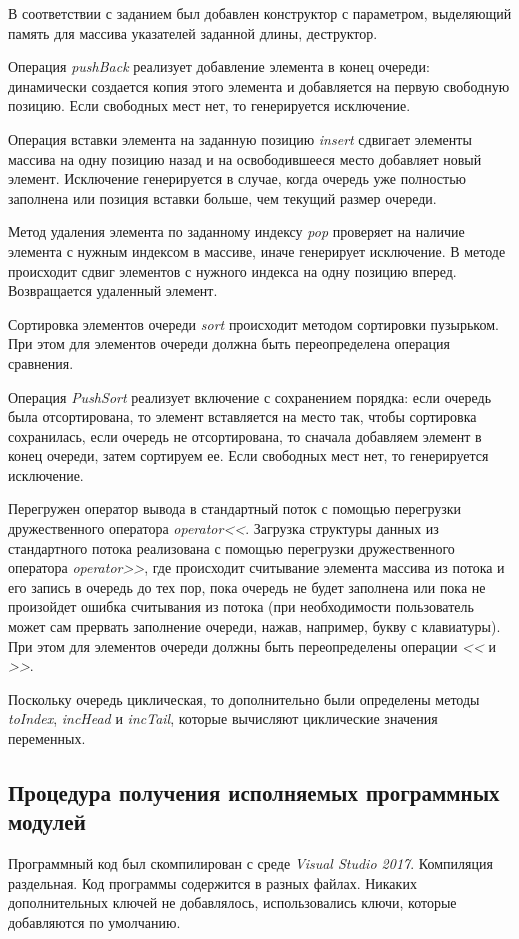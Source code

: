 \documentclass[a4paper,14pt]{article}
\begin{document}
В соответствии с заданием был добавлен конструктор с параметром, выделяющий память для массива указателей заданной длины, деструктор.

Операция \textit{pushBack} реализует добавление элемента в конец очереди: динамически создается копия этого элемента и добавляется на первую свободную позицию. Если свободных мест нет, то генерируется исключение.

Операция вставки элемента на заданную позицию \textit{insert} сдвигает элементы массива на одну позицию назад и на освободившееся место добавляет новый элемент. Исключение генерируется  в случае, когда очередь уже полностью заполнена или позиция вставки больше, чем текущий размер очереди.

Метод удаления элемента по заданному индексу \textit{pop} проверяет на наличие элемента с нужным индексом в массиве, иначе генерирует исключение. В методе происходит сдвиг элементов с нужного индекса на одну позицию вперед. Возвращается удаленный элемент.

Сортировка элементов очереди \textit{sort} происходит методом сортировки пузырьком. При этом для элементов очереди должна быть переопределена операция сравнения.

Операция \textit{PushSort} реализует включение с сохранением порядка: если очередь была отсортирована, то элемент вставляется на место так, чтобы сортировка сохранилась, если очередь не отсортирована, то сначала добавляем элемент в конец очереди, затем сортируем ее. Если свободных мест нет, то генерируется исключение.

Перегружен оператор вывода в стандартный поток с помощью перегрузки дружественного оператора \textit{operator<<}.
Загрузка структуры данных из стандартного потока реализована с помощью перегрузки дружественного оператора \textit{operator>>}, где происходит считывание элемента массива из потока и его запись в очередь до тех пор, пока очередь не будет заполнена или пока не произойдет ошибка считывания из потока (при необходимости пользователь может сам прервать заполнение очереди, нажав, например, букву с клавиатуры). При этом для элементов очереди должны быть переопределены операции \textit{<<} и \textit{>>}.

Поскольку очередь циклическая, то дополнительно были определены методы \textit{toIndex}, \textit{incHead} и \textit{incTail}, которые вычисляют циклические значения переменных.

\subsection{Процедура получения исполняемых программных модулей}
Программный код был скомпилирован с среде \textit{Visual Studio 2017}. Компиляция раздельная. Код программы содержится в разных файлах. Никаких дополнительных ключей не добавлялось, использовались ключи, которые добавляются по умолчанию.
\end{document}
